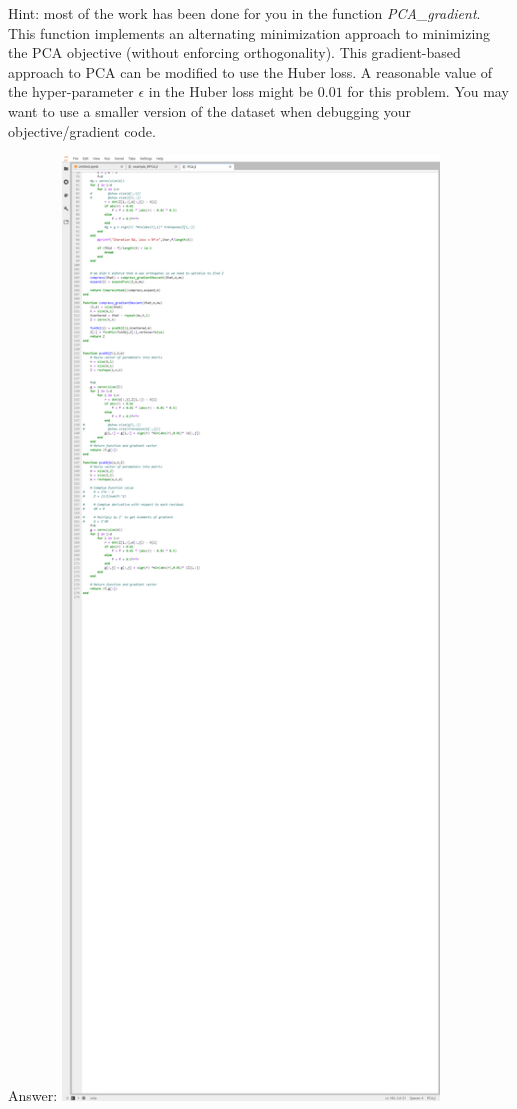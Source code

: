 \documentclass{article}
\def\ans#1{\par\gre{Answer: #1}}
\def\gre#1{{\color{gre}#1}}
\begin{document}
Hint: most of the work has been done for you in the function \emph{PCA\_gradient}. This function  implements an alternating minimization approach to minimizing the PCA objective (without enforcing orthogonality). This gradient-based approach to PCA can be modified to use the Huber loss. A reasonable value of the hyper-parameter $\epsilon$ in the Huber loss might be $0.01$ for this problem. You may want to use a smaller version of the dataset when debugging your objective/gradient code.
\ans{\includegraphics[width=10cm]{Q11.png}}
\end{document}

